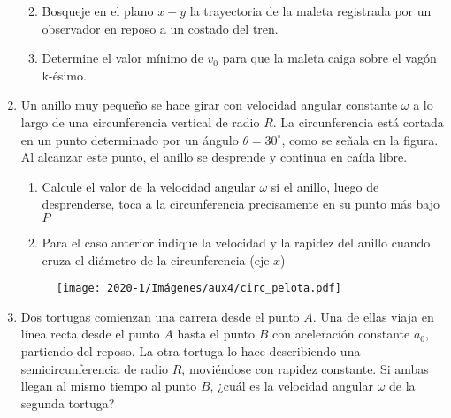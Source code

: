 \documentclass[letterpaper,11pt]{article}
\begin{document}
\begin{enumerate}
\begin{enumerate}
        \item Bosqueje en el plano $x-y$ la trayectoria de la maleta registrada por un observador en reposo a un costado del tren.
        
        \item Determine el valor mínimo de $v_0$ para que la maleta caiga sobre el vagón k-ésimo.
        
    \end{enumerate}
    
\item Un anillo muy pequeño se hace girar con velocidad angular constante $\omega$ a lo largo de una circunferencia vertical de radio $R$. La circunferencia está cortada en un punto determinado por un ángulo $\theta = 30^{\circ}$, como se señala en la figura. Al alcanzar este punto, el anillo se desprende y continua en caída libre.

\begin{multicols}{2}
    \begin{enumerate}
        \item Calcule el valor de la velocidad angular $\omega$ si el anillo, luego de desprenderse, toca a la circunferencia precisamente en su punto más bajo $P$
    
        \item Para el caso anterior indique la velocidad y la rapidez del anillo cuando cruza el diámetro de la circunferencia (eje $x$)
    \end{enumerate}
    \columnbreak
    \begin{figure}[H]
        \centering
        \texttt{[image: 2020-1/Imágenes/aux4/circ\_pelota.pdf]}
    \end{figure}
\end{multicols}

\item Dos tortugas comienzan una carrera desde el punto $A$. Una de ellas viaja en línea recta desde el punto $A$ hasta el punto $B$ con aceleración constante $a_0$, partiendo del reposo. La otra tortuga lo hace describiendo una semicircunferencia de radio $R$, moviéndose con rapidez constante. Si ambas llegan al mismo tiempo al punto $B$, ¿cuál es la velocidad angular $\omega$ de la segunda tortuga?
    
\begin{figure}[H]
    \centering
    \hspace{1em}
    \begin{subfigure}[t]{0.35\textwidth}
        \centering
        
    \end{subfigure}
\end{figure}


\end{enumerate}
\end{document}
